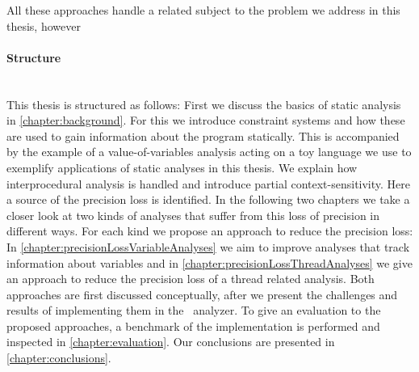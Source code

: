 All these approaches handle a related subject to the problem we address in this thesis, however 


\paragraph{Structure}\mbox{}\\
This thesis is structured as follows: First we discuss the basics of static analysis in \autoref{chapter:background}. For this we introduce constraint systems and how these are used to gain information about the program statically. This is accompanied by the example of a value-of-variables analysis acting on a toy language we use to exemplify applications of static analyses in this thesis. We explain how interprocedural analysis is handled and introduce partial context-sensitivity. Here a source of the precision loss is identified. In the following two chapters we take a closer look at two kinds of analyses that suffer from this loss of precision in different ways. For each kind we propose an approach to reduce the precision loss: In \autoref{chapter:precisionLossVariableAnalyses} we aim to improve analyses that track information about variables and in \autoref{chapter:precisionLossThreadAnalyses} we give an approach to reduce the precision loss of a thread related analysis. Both approaches are first discussed conceptually, after we present the challenges and results of implementing them in the \gob\ analyzer. To give an evaluation to the proposed approaches, a benchmark of the implementation is performed and inspected in \autoref{chapter:evaluation}. Our conclusions are presented in \autoref{chapter:conclusions}.
